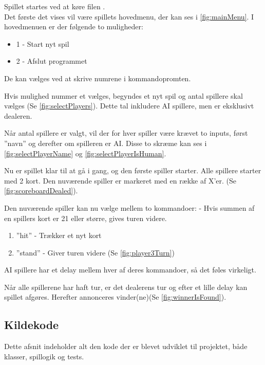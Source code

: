 \documentclass[a4paper]{article}
\newcommand{\namedref}[1]{\autoref{#1}} %
\begin{document}
        Spillet startes ved at køre filen . \\
        
        Det første det vises vil være spillets hovedmenu, der kan ses i \namedref{fig:mainMenu}.
        I hovedmenuen er der følgende to muligheder:
        \begin{itemize}
          \item 1 - Start nyt spil
          \item 2 - Afslut programmet
        \end{itemize}
        De kan vælges ved at skrive numrene i kommandopromten.

        Hvis mulighed nummer et vælges, begyndes et nyt spil og antal spillere skal vælges (Se \namedref{fig:selectPlayers}).
        Dette tal inkludere AI spillere, men er eksklusivt dealeren.

        Når antal spillere er valgt, vil der for hver spiller være krævet to inputs,
        først ”navn” og derefter om spilleren er AI.
        Disse to skræme kan ses i \namedref{fig:selectPlayerName} og \namedref{fig:selectPlayerIsHuman}.

        Nu er spillet klar til at gå i gang, og den første spiller starter.
        Alle spillere starter med 2 kort.
        Den nuværende spiller er markeret med en række af X'er. (Se \namedref{fig:scoreboardDealed}).

        Den nuværende spiller kan nu vælge mellem to kommandoer:
        - Hvis summen af en spillers kort er 21 eller større, gives turen videre.
        \begin{enumerate}
          \item ”hit” - Trækker et nyt kort
          \item ”stand” - Giver turen videre (Se \namedref{fig:player3Turn})
        \end{enumerate}

        AI spillere har et delay mellem hver af deres kommandoer, så det føles virkeligt.

        Når alle spillerene har haft tur, er det dealerens tur og efter et lille delay kan spillet afgøres.
        Herefter annonceres vinder(ne)(Se \namedref{fig:winnerIsFound}).

      \subsection{Kildekode} \label{ssec:sourceCode}
        Dette afsnit indeholder alt den kode der er blevet udviklet til projektet,
        både klasser, spillogik og tests.
\end{document}
